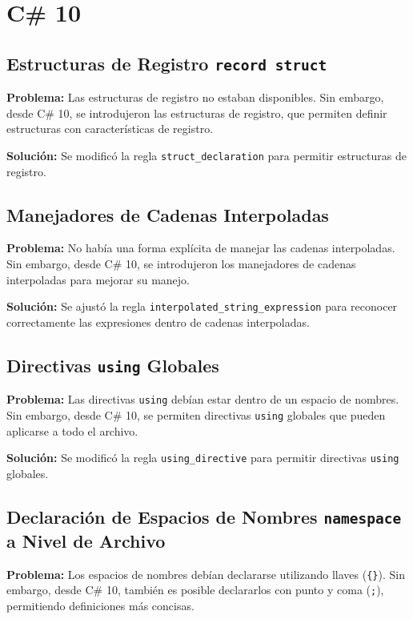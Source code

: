 \section*{C\# 10}

\subsection*{Estructuras de Registro \texttt{record struct}}
\textbf{Problema:} Las estructuras de registro no estaban disponibles. Sin embargo, desde C\# 10, se introdujeron las estructuras de registro, que permiten definir estructuras con características de registro.

\textbf{Solución:} Se modificó la regla \texttt{struct\_declaration} para permitir estructuras de registro.

\subsection*{Manejadores de Cadenas Interpoladas}
\textbf{Problema:} No había una forma explícita de manejar las cadenas interpoladas. Sin embargo, desde C\# 10, se introdujeron los manejadores de cadenas interpoladas para mejorar su manejo.

\textbf{Solución:} Se ajustó la regla \texttt{interpolated\_string\_expression} para reconocer correctamente las expresiones dentro de cadenas interpoladas.

\subsection*{Directivas \texttt{using} Globales}
\textbf{Problema:} Las directivas \texttt{using} debían estar dentro de un espacio de nombres. Sin embargo, desde C\# 10, se permiten directivas \texttt{using} globales que pueden aplicarse a todo el archivo.

\textbf{Solución:} Se modificó la regla \texttt{using\_directive} para permitir directivas \texttt{using} globales.

\subsection*{Declaración de Espacios de Nombres \texttt{namespace} a Nivel de Archivo}
\textbf{Problema:} Los espacios de nombres debían declararse utilizando llaves (\texttt{\{\}}). Sin embargo, desde C\# 10, también es posible declararlos con punto y coma (\texttt{;}), permitiendo definiciones más concisas.


